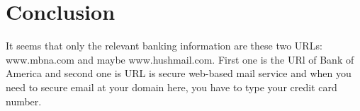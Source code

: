 \documentclass[5pt]{article}
\begin{document}
\section{Conclusion}
It seems that only the relevant banking information are these two URLs:
www.mbna.com and maybe www.hushmail.com. First one is the URl of Bank of America
and second one is URL is secure web-based mail service and when you need to
secure email at your domain here, you have to type your credit card number.
\end{document}
